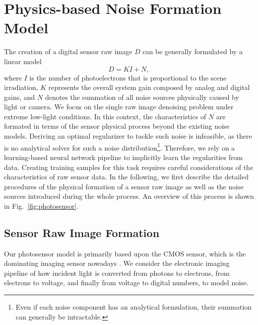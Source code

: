 \documentclass[10pt,twocolumn,letterpaper]{article}
\begin{document}
\section{Physics-based Noise Formation Model} \label{sec:noise-model}
The creation of a digital sensor raw image $D$ can be generally formulated by a
linear model
  \begin{equation}
    \label{eq:formation}
    D = K I + N,
  \end{equation}
where $I$ is the number of photoelectrons that is proportional to the scene
irradiation, $K$ represents the overall system gain composed by analog and
digital gains, and $N$ denotes the summation of all noise sources physically caused
by light or camera.
We focus on  the single raw image denoising problem under extreme low-light
conditions. In this context, the characteristics of $N$ are formated in terms of
the sensor
physical process beyond the existing noise models.
Deriving an optimal regularizer to tackle such noise is infeasible, as
there is no analytical solver for such a noise distribution\footnote{Even if each noise component has an analytical formulation, their summation can generally be intractable.}. Therefore, we rely on a learning-based neural network
pipeline to implicitly learn the regularities from data. Creating training
samples for this task requires careful considerations of the characteristics of
raw sensor data. In the following, we first describe the detailed procedures of
the physical formation of a sensor raw image as well as the noise sources
introduced during the whole process. An overview of this process is shown in
Fig.~\ref{fig:photosensor}.

\subsection{Sensor Raw Image Formation} \label{sec: raw formation}
Our photosensor model is primarily based upon the CMOS sensor, which is the dominating imaging sensor nowadays \cite{grandviewresearch}. 
  We consider the electronic imaging pipeline of how incident light is converted from
photons to electrons, from electrons to voltage, and finally from voltage to
digital numbers, to model noise.
\end{document}

